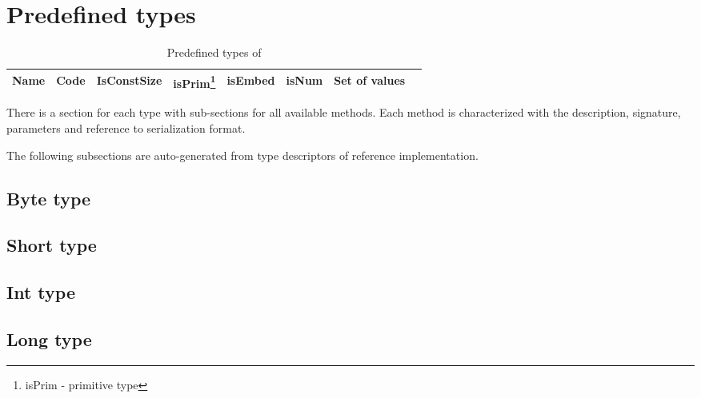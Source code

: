 \section{Predefined types}
\label{sec:appendix:predeftypes}

\begin{table}[h]
    \small
    \begin{tabu}{|l |l |l |l |l |l |l |l|}
     \hline
     \rowfont{\bfseries}
        Name   &   Code   &  IsConstSize & 
        isPrim\footnote{isPrim - primitive type} & 
        isEmbed  & isNum & Set of values \\
        \hline



    \hline
    \end{tabu}
    \caption{Predefined types of \langname}
    \label{table:predeftypes}
\end{table}

There is a section for each type with sub-sections for all available methods. Each method
is characterized with the description, signature, parameters and reference to
serialization format.

The following subsections are auto-generated from type descriptors of \langname reference
implementation.

% 

\subsection{Byte type}
\label{sec:type:Byte}


\subsection{Short type}
\label{sec:type:Short}


\subsection{Int type}
\label{sec:type:Int}


\subsection{Long type}
\label{sec:type:Long}


